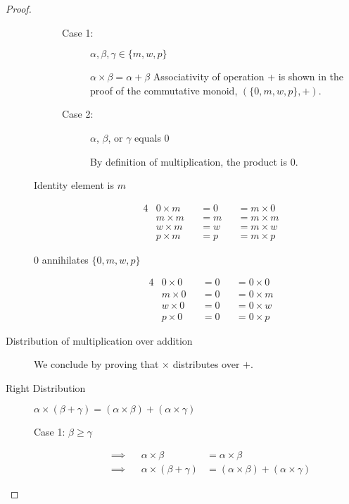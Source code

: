 \documentclass[runningheads]{llncs}
\begin{document}
\begin{proof}
\begin{description}
\begin{description}
				      \begin{description}
					      \item[Case 1: ] \(\alpha, \beta, \gamma \in \{m,w,p\} \)

						      \(\alpha \times \beta = \alpha + \beta \) Associativity of operation + is shown in the proof of the commutative monoid, \((\{0,m,w,p \}, +)\).

					      \item[Case 2: ] \(\alpha\), \(\beta\), or \(\gamma\) equals \(0\)

						      By definition of multiplication, the product is \(0\).
				      \end{description}

				\item[Identity element is \(m\)]
					\begin{alignat*}{4}
						 & 0 \times m &  & = 0 &  & = m \times 0 \\
						 & m \times m &  & = m &  & = m \times m \\
						 & w \times m &  & = w &  & = m \times w \\
						 & p \times m &  & = p &  & = m \times p
					\end{alignat*}

				\item[0 annihilates \(\{0,m,w,p\}\)]
					\begin{alignat*}{4}
						 & 0 \times 0 &  & = 0 &  & = 0 \times 0 \\
						 & m \times 0 &  & = 0 &  & = 0 \times m \\
						 & w \times 0 &  & = 0 &  & = 0 \times w \\
						 & p \times 0 &  & = 0 &  & = 0 \times p
					\end{alignat*}
			\end{description}

		\item [Distribution of multiplication over addition]
		      We conclude by proving that \(\times \) distributes over \(+\).

		\item[Right Distribution]
			\(\alpha \times (\beta + \gamma) = (\alpha \times \beta) + (\alpha \times \gamma)\)
			\begin{description}
				\item[Case 1: \(\beta \geqslant \gamma\)]
					\begin{align*}
						\implies &  & \alpha \times \beta            & = \alpha \times \beta                              \\
						\implies &  & \alpha \times (\beta + \gamma) & = (\alpha \times \beta ) + (\alpha \times \gamma )
					\end{align*}


\end{description}
\end{description}
\end{proof}
\end{document}
